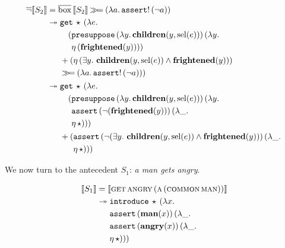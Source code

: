 \begin{align*}
  \mathop{\overline{\lnot}} \llbracket S_2 \rrbracket
  &= \overline{\mathrm{box}}\,\llbracket S_2 \rrbracket \mathbin{\gg\!=} (\lambda a.\, \mathtt{assert}!\,(\lnot a)) \\
  &\twoheadrightarrow 
    \begin{aligned}[t]
      &\mathtt{get}\,\star\,(\lambda e.\,  \\
      &\quad \begin{aligned}[t]
          (&\mathtt{presuppose}\,(\lambda y.\, \textbf{children}(y, \operatorname{sel}(e)))\,(\lambda y.\,  \\
           &\eta\,(\textbf{frightened}(y))))
         \end{aligned} \\
      &+ (\eta\,(\exists y.\ \textbf{children}(y, \operatorname{sel}(e)) \land \textbf{frightened}(y))) \\
      &\mathbin{\gg\!=} (\lambda a.\, \mathtt{assert}!\,(\lnot a)))
       \end{aligned} \\
  &\twoheadrightarrow 
    \begin{aligned}[t]
      &\mathtt{get}\,\star\,(\lambda e.\,  \\
      &\quad \begin{aligned}[t]
          (&\mathtt{presuppose}\,(\lambda y.\, \textbf{children}(y, \operatorname{sel}(e)))\,(\lambda y.\,  \\
           &\mathtt{assert}\,(\lnot (\textbf{frightened}(y)))\,(\lambda \_.\,  \\
           &\eta\,\star)))
         \end{aligned} \\
      &+ \begin{aligned}[t]
          (&\mathtt{assert}\,(\lnot (\exists y.\ \textbf{children}(y, \operatorname{sel}(e)) \land \textbf{frightened}(y)))\,(\lambda \_.\,  \\
           &\eta\,\star)))
         \end{aligned}
    \end{aligned}
\end{align*}

We now turn to the antecedent $S_1$: \emph{a man gets angry}.

\begin{align*}
  \llbracket S_1 \rrbracket
  &= \llbracket \textsc{get}\,\textsc{angry}\,(\textsc{a}\,(\textsc{common}\,\textsc{man})) \rrbracket \\
  &\twoheadrightarrow \begin{aligned}[t]
      &\mathtt{introduce}\,\star\,(\lambda x.\,  \\
      &\mathtt{assert}\,(\textbf{man}(x))\,(\lambda \_.\,  \\
      &\mathtt{assert}\,(\textbf{angry}(x))\,(\lambda \_.\,  \\
      &\eta\,\star)))
    \end{aligned}
\end{align*}

